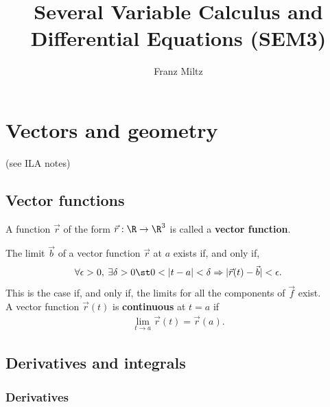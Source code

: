 \documentclass{article}
\begin{document}
\title{Several Variable Calculus and Differential Equations (SEM3)}
\author{Franz Miltz}
\maketitle
\tableofcontents
\pagebreak



\section{Vectors and geometry}



 (see ILA notes)
\setcounter{subsection}{4}


\subsection{Vector functions}


\begin{definition}
	A function $\vec r$ of the form $\vec r: \R \to \R^3$ is called a \textbf{vector function}.
\end{definition}
\begin{definition}
	The limit $\vec b$ of a vector function $\vec r$ at $a$ exists if, and only if,
	\begin{align*}
		\forall \epsilon > 0,\: \exists \delta > 0 \st 0 < |t-a| < \delta \Rightarrow |\vec r(t) - \vec b|<\epsilon.
	\end{align*}
	This is the case if, and only if, the limits for all the components of $\vec f$ exist.\\
	A vector function $\vec r(t)$ is \textbf{continuous} at $t=a$ if
	\begin{align*}
		\lim_{t\to a} \vec r (t) = \vec r (a).
	\end{align*}
\end{definition}


\subsection{Derivatives and integrals}


\subsubsection{Derivatives}
\end{document}
